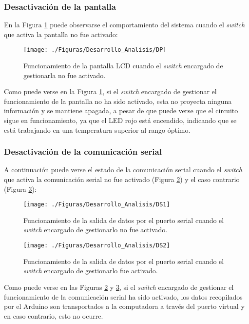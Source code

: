 \subsubsection{Desactivación de la pantalla}
En la Figura \ref{fig:DP} puede observarse el comportamiento del sistema cuando el \textit{switch} que activa la pantalla no fue activado: 

\begin{figure}[H]
\centering
\texttt{[image: ./Figuras/Desarrollo\_Analisis/DP]}
\caption{Funcionamiento de la pantalla LCD cuando el \textit{switch} encargado de gestionarla no fue activado.} 
\label{fig:DP}
\end{figure}

Como puede verse en la Figura \ref{fig:DP}, si el \textit{switch} encargado de gestionar el funcionamiento de la pantalla no ha sido activado, esta no proyecta ninguna información y se mantiene apagada, a pesar de que puede verse que el circuito sigue en funcionamiento, ya que el LED rojo está encendido, indicando que se está trabajando en una temperatura superior al rango óptimo.

\subsubsection{Desactivación de la comunicación serial}
A continuación puede verse el estado de la comunicación serial cuando el \textit{switch} que activa la comunicación serial no fue activado (Figura \ref{fig:DS1}) y el caso contrario (Figura \ref{fig:DS2}): 

\begin{figure}[H]
\centering
\texttt{[image: ./Figuras/Desarrollo\_Analisis/DS1]}
\caption{Funcionamiento de la salida de datos por el puerto serial cuando el \textit{switch} encargado de gestionarlo no fue activado.} 
\label{fig:DS1}
\end{figure}

\begin{figure}[H]
\centering
\texttt{[image: ./Figuras/Desarrollo\_Analisis/DS2]}
\caption{Funcionamiento de la salida de datos por el puerto serial cuando el \textit{switch} encargado de gestionarlo fue activado.} 
\label{fig:DS2}
\end{figure}

Como puede verse en las Figuras \ref{fig:DS1} y \ref{fig:DS2}, si el \textit{switch} encargado de gestionar el funcionamiento de la comunicación serial ha sido activado, los datos recopilados por el Arduino son transportados a la computadora a través del puerto virtual y en caso contrario, esto no ocurre. 

